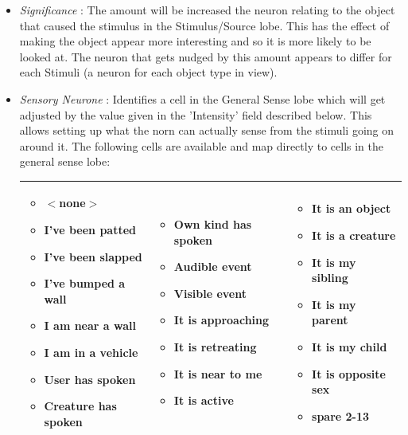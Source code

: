 \documentclass[11pt,twoside,a4paper]{article}
\begin{document}
\begin{itemize}
\item[] \emph{Significance} : The amount will be increased the neuron relating to the object that caused the stimulus in the Stimulus/Source lobe. This has the effect of making the object appear more interesting and so it is more likely to be looked at. The neuron that gets nudged by this amount appears to differ for each Stimuli (a neuron for each object type in view). 
\item[] \emph{Sensory Neurone} : Identifies a cell in the General Sense lobe which will get adjusted by the value given in the 'Intensity' field described below. This allows setting up what the norn can actually sense from the stimuli going on around it. The following cells are available and map directly to cells in the general sense lobe:
	\begin{center} \begin{scriptsize}
\begin{tabular}{|p{}|p{}|p{}|}
		\hline
			\begin{itemize}
				\item $<$none$>$
				\item I've been patted
				\item I've been slapped
				\item I've bumped a wall
				\item I am near a wall
				\item I am in a vehicle
				\item User has spoken
				\item Creature has spoken
			\end{itemize}
			&
			\begin{itemize}
				\item Own kind has spoken
				\item Audible event
				\item Visible event
				\item It is approaching
				\item It is retreating
				\item It is near to me
				\item It is active
			\end{itemize}
			&
			\begin{itemize}
				\item It is an object
				\item It is a creature
				\item It is my sibling
				\item It is my parent
				\item It is my child
				\item It is opposite sex
				\item spare 2-13
			\end{itemize} \\
		\hline
		\end{tabular}
	\end{scriptsize} \end{center}~\\
 

\end{itemize}
\end{document}
